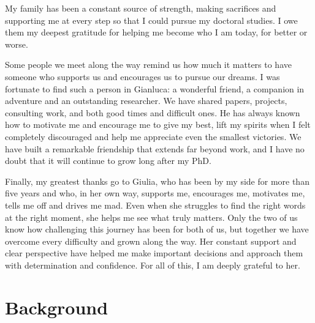 \documentclass[12pt,a4paper,openright,twoside]{book}
\theoremstyle{definition}
\begin{document}
\begin{acknowledgements}
My family has been a constant source of strength, making sacrifices and supporting me at every step so that I could pursue my doctoral studies.
%
I owe them my deepest gratitude for helping me become who I am today, for better or worse.

Some people we meet along the way remind us how much it matters to have someone who supports us and encourages us to pursue our dreams.
%
I was fortunate to find such a person in Gianluca: a wonderful friend, a companion in adventure and an outstanding researcher.
%
We have shared papers, projects, consulting work, and both good times and difficult ones.
%
He has always known how to motivate me and encourage me to give my best, lift my spirits when I felt completely discouraged and help me appreciate even the smallest victories.
%
We have built a remarkable friendship that extends far beyond work, and I have no doubt that it will continue to grow long after my PhD.

Finally, my greatest thanks go to Giulia, who has been by my side for more than five years and who, in her own way, supports me, encourages me, motivates me, tells me off and drives me mad.
%
Even when she struggles to find the right words at the right moment, she helps me see what truly matters.
%
Only the two of us know how challenging this journey has been for both of us, but together we have overcome every difficulty and grown along the way.
%
Her constant support and clear perspective have helped me make important decisions and approach them with determination and confidence.
%
For all of this, I am deeply grateful to her.

\end{acknowledgements}

\tableofcontents   
\listoffigures     %
\lstlistoflistings %

\mainmatter



\part{Background}


\end{document}
